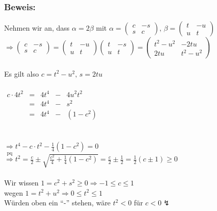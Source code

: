  \subsubsection{Beweis:}
 Nehmen wir an, dass $\alpha = 2 \beta$ mit $\alpha = \begin{pmatrix} c & -s \\ s & c \end{pmatrix}, \, \beta = \begin{pmatrix} t & -u \\ u & t \end{pmatrix}$\\
 $\Rightarrow \begin{pmatrix} c & -s \\ s & c \end{pmatrix} = \begin{pmatrix} t & -u \\ u & t \end{pmatrix} \begin{pmatrix} t & -s \\ u & t \end{pmatrix} = \begin{pmatrix} t^{2}-u^{2} & -2tu \\ 2tu & t^{2}-u^{2} \end{pmatrix}$\\
 \qquad\\
 Es gilt also $c=t^{2}-u^{2}, \, s=2tu$\\ 
 \qquad\\
$
\begin{array}{rcrcr}
c \cdot 4t^{2} &=& 4t^{4} &-& 4u^{2}t^{2}\\
 &=& 4t^{4} &-&  s^{2}\\
 &=& 4t^{4} &-& (1-c^{2})
\end{array} 
$\\
\qquad\\
\qquad\\
$ \Rightarrow t^{4} - c\cdot t^{2} - \frac{1}{4}(1-c^{2})=0$\\
$\mathop{\Rightarrow}\limits^{\text{pq}}t^{2} = \frac{c}{2} \pm \sqrt{\frac{c^{2}}{4}+\frac{1}{4}(1-c^{2})} = \frac{c}{2} \pm \frac{1}{2}=\frac{1}{2}(c\pm 1) \geq 0$\\
\qquad\\
Wir wissen $1=c^{2}+s^{2}\geq 0 \Rightarrow  -1 \leq c \leq 1$\\
wegen $1=t^{2}+u^{2}\Rightarrow 0 \leq t^{2}\leq 1$\\
Würden oben ein "`-"' stehen, wäre $t^{2} < 0$ für $c<0 \lightning$\\
